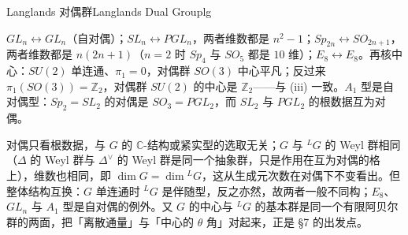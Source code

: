 \begin{centry}{Langlands 对偶群}{Langlands Dual Group}{lg}
\begin{example}[对偶群小表]
$GL_{n}\leftrightarrow GL_{n}$（自对偶）；$SL_{n}\leftrightarrow PGL_{n}$，两者维数都是 $n^{2}-1$；$Sp_{2n}\leftrightarrow SO_{2n+1}$，两者维数都是 $n(2n+1)$（$n=2$ 时 $Sp_{4}$ 与 $SO_{5}$ 都是 $10$ 维）；$E_{8}\leftrightarrow E_{8}$。再核中心：$SU(2)$ 单连通、$\pi_{1}=0$，对偶群 $SO(3)$ 中心平凡；反过来 $\pi_{1}(SO(3))=\mathbb Z_{2}$，对偶群 $SU(2)$ 的中心是 $\mathbb Z_{2}$——与 (iii) 一致。$A_{1}$ 型是自对偶型：$Sp_{2}=SL_{2}$ 的对偶是 $SO_{3}=PGL_{2}$，而 $SL_{2}$ 与 $PGL_{2}$ 的根数据互为对偶。
\end{example}

\begin{remark}
对偶只看根数据，与 $G$ 的 $\mathbb C$-结构或紧实型的选取无关；$G$ 与 ${}^{L}G$ 的 Weyl 群相同（$\Delta$ 的 Weyl 群与 $\Delta^{\vee}$ 的 Weyl 群是同一个抽象群，只是作用在互为对偶的格上），维数也相同，即 $\dim G=\dim{}^{L}G$，这从生成元次数在对偶下不变看出。但整体结构互换：$G$ 单连通时 ${}^{L}G$ 是伴随型，反之亦然，故两者一般不同构；$E_{8}$、$GL_{n}$ 与 $A_{1}$ 型是自对偶的例外。又 $G$ 的中心与 ${}^{L}G$ 的基本群是同一个有限阿贝尔群的两面，把「离散通量」与「中心的 $\theta$ 角」对起来，正是 §7 的出发点。
\end{remark}


\end{centry}

